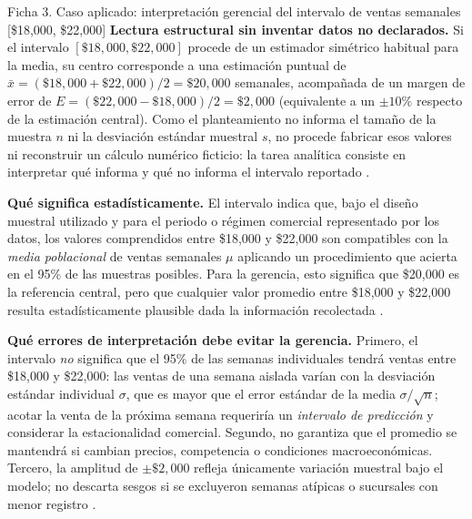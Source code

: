 {
\begin{fichainvestigacion}{Ficha 3. Caso aplicado: interpretación gerencial del intervalo de ventas semanales [\$18,000, \$22,000]}
\textbf{Lectura estructural sin inventar datos no declarados.} Si el intervalo $[\$18,000, \$22,000]$ procede de un estimador simétrico habitual para la media, su centro corresponde a una estimación puntual de $\bar{x} = (\$18,000 + \$22,000)/2 = \$20,000$ semanales, acompañada de un margen de error de $E = (\$22,000 - \$18,000)/2 = \$2,000$ (equivalente a un $\pm 10\%$ respecto de la estimación central). Como el planteamiento no informa el tamaño de la muestra $n$ ni la desviación estándar muestral $s$, no procede fabricar esos valores ni reconstruir un cálculo numérico ficticio: la tarea analítica consiste en interpretar qué informa y qué no informa el intervalo reportado \citep[sec.~1.3.5.2]{nistHandbook}.

\textbf{Qué significa estadísticamente.} El intervalo indica que, bajo el diseño muestral utilizado y para el periodo o régimen comercial representado por los datos, los valores comprendidos entre \$18,000 y \$22,000 son compatibles con la \textit{media poblacional} de ventas semanales $\mu$ aplicando un procedimiento que acierta en el 95\% de las muestras posibles. Para la gerencia, esto significa que \$20,000 es la referencia central, pero que cualquier valor promedio entre \$18,000 y \$22,000 resulta estadísticamente plausible dada la información recolectada \citep{holmesBusiness2023,nistHandbook}.

\textbf{Qué errores de interpretación debe evitar la gerencia.} Primero, el intervalo \textit{no} significa que el 95\% de las semanas individuales tendrá ventas entre \$18,000 y \$22,000: las ventas de una semana aislada varían con la desviación estándar individual $\sigma$, que es mayor que el error estándar de la media $\sigma/\sqrt{n}$; acotar la venta de la próxima semana requeriría un \textit{intervalo de predicción} y considerar la estacionalidad comercial. Segundo, no garantiza que el promedio se mantendrá si cambian precios, competencia o condiciones macroeconómicas. Tercero, la amplitud de $\pm\$2,000$ refleja únicamente variación muestral bajo el modelo; no descarta sesgos si se excluyeron semanas atípicas o sucursales con menor registro \citep{nistHandbook,bradley2021}.


\end{fichainvestigacion}}
